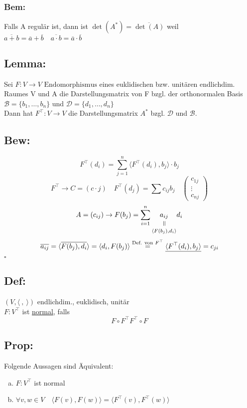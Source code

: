 \documentclass[titlepage,12pt,a4paper,ngerman]{report}
\newenvironment{bew}[1]{\subsection{Bew: #1}}{\hfill$\square$}
\newcommand{\Bew}[2]{\begin{bew}{#1}#2\end{bew}}
\newcommand{\verteq}{\rotatebox{90}{$\,=$}}
\newcommand{\equalto}[2]{\underset{\scriptstyle\overset{\mkern4mu\verteq}{#2}}{#1}}
\newcommand{\tx}[1]{\textrm{#1}}
\newcommand{\basis}[3]{\{#1_{#2}, \dots, #1_{#3}\}}
\newcommand{\summ}[2]{\sum_{#1}^{#2}}
\newcommand{\enph}{F: V \to V \textrm{ Endomorphismus}}
\begin{document}
\subsubsection{Bem:}
Falls A regulär ist, dann ist $ \det(A^*) = \overline{\det(A)} $ weil $ \overline{a+b} = \overline{a} + \overline{b} \quad \overline{a \cdot b} = \overline{a} \cdot \overline{b} $
\subsection{Lemma:}
Sei $ \enph $ eines euklidischen bzw. unitären endlichdim. Raumes V und A die Darstellungsmatrix von F bzgl. der orthonormalen Basis $ \mathcal{B} = \basis{b}{1}{n} $ und $ \mathcal{D} = \basis{d}{1}{n} $\\
Dann hat $ F^\top: V \to V $ die Darstellungsmatrix $ A^* $ bzgl. $ \mathcal{D} $ und $ \mathcal{B} $.
\Bew{}{$$F^\top (d_i) = \summ{j=1}{n} \langle F^\top (d_i), b_j \rangle \cdot b_j$$
	$$F^\top \to C = (c \cdot j) \quad F^\top (d_j) = \sum c_{ij} b_j \quad \begin{pmatrix}
	c_{1j} \\ \vdots \\ c_{nj}\end{pmatrix}$$
	$$A= (c_{ij}) \to F(b_j) = \summ{i = 1}{n} \equalto{a_{ij}}{\langle F(b_j),d_i\rangle} d_i$$
	$$\overline{a_{ij}} = \langle \overline{F(b_j), d_i} \rangle = \langle d_i, F(b_j) \rangle \buildrel{\tx{Def. von }F^\top} \over = \underline{\langle F^\top (d_i),b_j \rangle} = c_{ji}$$
}
\subsection{Def:}
$ (V,\langle\ ,\ \rangle) $ endlichdim., euklidisch, unitär\\
$ F:V^\top $ ist \underline{normal}, falls
$$F \circ F^\top  F^\top \circ F $$ 
\subsection{Prop:}
Folgende Aussagen sind Äquivalent:
\begin{enumerate}[a)]
	\item $ F:V^\top $ ist normal
	\item $ \forall v, w \in V \quad \langle F(v) , F(w) \rangle = \langle F^\top(v) , F^\top(w) \rangle $
\end{enumerate}
\end{document}
